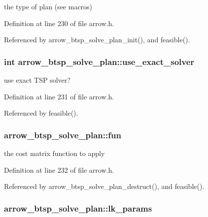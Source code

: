 the type of plan (see macros) 

Definition at line 230 of file arrow.h.

Referenced by arrow\_\-btsp\_\-solve\_\-plan\_\-init(), and feasible().\hypertarget{structarrow__btsp__solve__plan_fed81dda6e547af712c67dc2c35b55b3}{
\subsubsection{\setlength{\rightskip}{0pt plus 5cm}int {\bf arrow\_\-btsp\_\-solve\_\-plan::use\_\-exact\_\-solver}}}
\label{structarrow__btsp__solve__plan_fed81dda6e547af712c67dc2c35b55b3}


use exact TSP solver? 

Definition at line 231 of file arrow.h.

Referenced by feasible().\hypertarget{structarrow__btsp__solve__plan_89fa2ad1bcc026cd50fd7abc6c30ce3e}{
\subsubsection{ {\bf arrow\_\-btsp\_\-solve\_\-plan::fun}}}
\label{structarrow__btsp__solve__plan_89fa2ad1bcc026cd50fd7abc6c30ce3e}


the cost matrix function to apply 

Definition at line 232 of file arrow.h.

Referenced by arrow\_\-btsp\_\-solve\_\-plan\_\-destruct(), and feasible().\hypertarget{structarrow__btsp__solve__plan_576ea43a6d1de8f9c46f02edf2849122}{
\subsubsection{ {\bf arrow\_\-btsp\_\-solve\_\-plan::lk\_\-params}}}
\label{structarrow__btsp__solve__plan_576ea43a6d1de8f9c46f02edf2849122}


